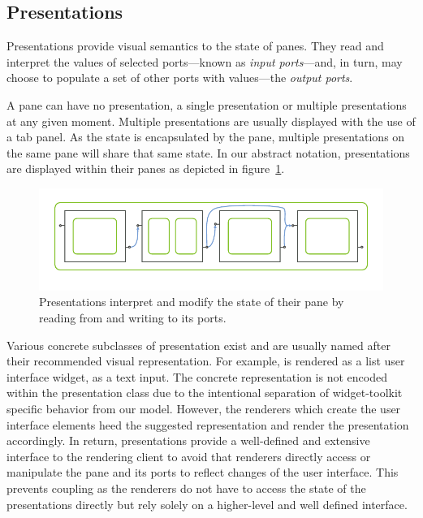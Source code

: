 \documentclass[a4paper,10pt,twoside]{book}
\begin{document}
\subsection{Presentations}
\label{sec:impl/presentations}

Presentations provide visual semantics to the state of panes. They read and interpret the values of selected ports---known as \emph{input ports}---and, in turn, may choose to populate a set of other ports with values---the \emph{output ports}.

A pane can have no presentation, a single presentation or multiple presentations at any given moment. Multiple presentations are usually displayed with the use of a tab panel. As the state is encapsulated by the pane, multiple presentations on the same pane will share that same state. In our abstract notation, presentations are displayed within their panes as depicted in figure~\ref{fig:abs-presentations}.

\begin{figure}[htbp]
\centerline{\includegraphics[width=\linewidth]{presentations.pdf}}
\caption{Presentations interpret and modify the state of their pane by reading from and writing to its ports.}
\label{fig:abs-presentations}
\end{figure}

Various concrete subclasses of presentation exist and are usually named after their recommended visual representation. For example,  is rendered as a list user interface widget,  as a text input. The concrete representation is not encoded within the presentation class due to the intentional separation of widget-toolkit specific behavior from our model. However, the renderers which create the user interface elements heed the suggested representation and render the presentation accordingly. In return, presentations provide a well-defined and extensive interface to the rendering client to avoid that renderers directly access or manipulate the pane and its ports to reflect changes of the user interface. This prevents coupling as the renderers do not have to access the state of the presentations directly but rely solely on a higher-level and well defined interface.
\end{document}
